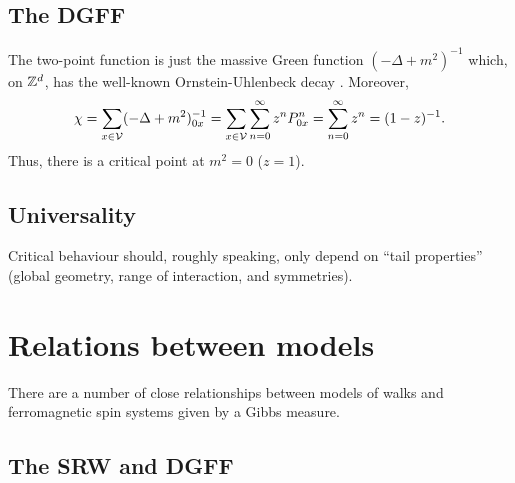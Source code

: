 
\subsection{The DGFF}

The two-point function is just the massive Green function $(-\Delta + m^2)^{-1}$
which, on ${ {{\mathbb Z}}^d }$, has the well-known Ornstein-Uhlenbeck decay .
Moreover,
\begin{equation}
\chi
  =
\sum_{x\in\mathcal{V}} (-\Delta + m^2)^{-1}_{0x}
  =
\sum_{x\in\mathcal{V}} \sum_{n=0}^\infty z^n P^n_{0x}
  =
\sum_{n=0}^\infty z^n
  =
(1 - z)^{-1}.
\end{equation}
Thus, there is a critical point at $m^2 = 0$ ($z = 1$).




\subsection{Universality}

Critical behaviour should, roughly speaking, only depend on ``tail properties''
(global geometry, range of interaction, and symmetries).


\section{Relations between models}

There are a number of close relationships between models of walks and ferromagnetic spin
systems given by a Gibbs measure.


\subsection{The SRW and DGFF}


